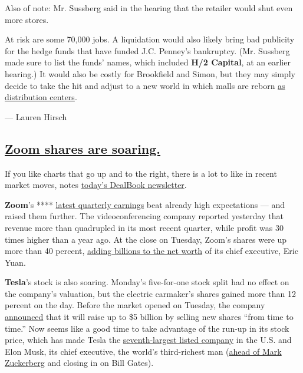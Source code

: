 Also of note: Mr. Sussberg said in the hearing that the retailer would
shut even more stores.

At risk are some 70,000 jobs. A liquidation would also likely bring bad
publicity for the hedge funds that have funded J.C. Penney's bankruptcy.
(Mr. Sussberg made sure to list the funds' names, which included
\textbf{H/2 Capital}, at an earlier hearing.) It would also be costly
for Brookfield and Simon, but they may simply decide to take the hit and
adjust to a new world in which malls are reborn
\href{https://www.wsj.com/articles/amazon-and-giant-mall-operator-look-at-turning-sears-j-c-penney-stores-into-fulfillment-centers-11596992863}{as
distribution centers}.

--- Lauren Hirsch

\hypertarget{zoom-shares-are-soaring}{%
\subsection{\texorpdfstring{\protect\hyperlink{zoom-shares-are-soaring}{Zoom
shares are
soaring.}}{Zoom shares are soaring.}}\label{zoom-shares-are-soaring}}

If you like charts that go up and to the right, there is a lot to like
in recent market moves, notes
\href{https://www.nytimes3xbfgragh.onion/2020/09/01/business/dealbook/tiktok-trump-china-cold-war.html}{today's
DealBook newsletter}.

\textbf{Zoom}'s ****
\href{https://www.nytimes3xbfgragh.onion/live/2020/08/31/business/stock-market-today-coronavirus\#zooms-profit-jumped-3276-percent-in-the-2nd-quarter}{latest
quarterly earnings} beat already high expectations --- and raised them
further. The videoconferencing company reported yesterday that revenue
more than quadrupled in its most recent quarter, while profit was 30
times higher than a year ago. At the close on Tuesday, Zoom's shares
were up more than 40 percent,
\href{https://www.bloomberg.com/news/articles/2020-09-01/zoom-s-record-quarter-adds-4-2-billion-to-ceo-yuan-s-fortune?sref=0w5HLLb3}{adding
billions to the net worth} of its chief executive, Eric Yuan.

\textbf{Tesla}'s stock is also soaring. Monday's five-for-one stock
split had no effect on the company's valuation, but the electric
carmaker's shares gained more than 12 percent on the day. Before the
market opened on Tuesday, the company
\href{https://ir.tesla.com/node/21016/html}{announced} that it will
raise up to \$5 billion by selling new shares ``from time to time.'' Now
seems like a good time to take advantage of the run-up in its stock
price, which has made Tesla the
\href{https://www.marketwatch.com/story/tesla-passes-visa-to-become-seventh-largest-us-company-by-market-cap-2020-08-31}{seventh-largest
listed company} in the U.S. and Elon Musk, its chief executive, the
world's third-richest man
(\href{https://www.bloomberg.com/news/articles/2020-08-31/elon-musk-is-now-richer-than-mark-zuckerberg-on-tesla-surge?sref=0w5HLLb3}{ahead
of Mark Zuckerberg} and closing in on Bill Gates).

